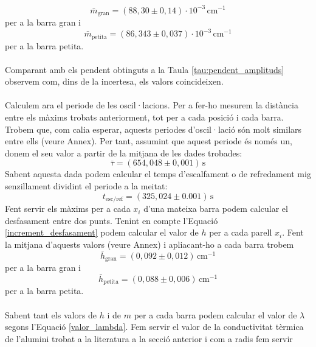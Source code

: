 \documentclass[12pt,twosides,onecolumn,openany]{article}
\begin{document}
\begin{multicols}{2}
\begin{equation*}
  \bar{m}_{\text{gran}} = (88,30\pm0,14)\cdot 10^{-3} \, \text{cm}^{-1}
\end{equation*}
per a la barra gran i
\begin{equation*}
  \bar{m}_{\text{petita}} = (86,343\pm0,037)\cdot 10^{-3} \, \text{cm}^{-1}
\end{equation*} 
per a la barra petita.\\\\
Comparant amb els pendent obtinguts a la Taula \ref{tau:pendent_amplituds} observem com, dins de la incertesa, els valors coincideixen.\\\\
Calculem ara el periode de les oscil·lacions. Per a fer-ho mesurem la distància entre els màxims trobats anteriorment, tot per a cada posició i cada barra. Trobem que, com calia esperar, aquests periodes d'oscil·lació són molt similars entre ells (veure Annex). Per tant, assumint que aquest periode és només un, donem el seu valor a partir de la mitjana de les dades trobades:
\begin{equation*}
  \bar{\tau} = (654,048\pm0,001) \, \text{s}
\end{equation*}
Sabent aquesta dada podem calcular el temps d'escalfament o de refredament mig senzillament dividint el periode a la meitat:
\begin{equation*}
  t_{\text{esc/ref}} = (325,024\pm0.001) \, \text{s}
\end{equation*}
Fent servir els màxims per a cada $x_i$ d'una mateixa barra podem calcular el desfasament entre dos punts. Tenint en compte l'Equació \eqref{increment_desfasament} podem calcular el valor de $h$ per a cada parell $x_i$. Fent la mitjana d'aquests valors (veure Annex) i apliacant-ho a cada barra trobem
\begin{equation*}
  \bar{h}_{\text{gran}} = (0,092\pm0,012) \, \text{cm}^{-1}
\end{equation*}
per a la barra gran i
\begin{equation*}
  \bar{h}_{\text{petita}} = (0,088\pm0,006) \, \text{cm}^{-1}
\end{equation*}
per a la barra petita.\\\\
Sabent tant els valors de $h$ i de $m$ per a cada barra podem calcular el valor de $\lambda$ segons l'Equació \ref{valor_lambda}. Fem servir el valor de la conductivitat tèrmica de l'alumini trobat a la literatura a la secció anterior i com a radis fem servir
\begin{equation*}

\end{equation*}
\end{multicols}
\end{document}
